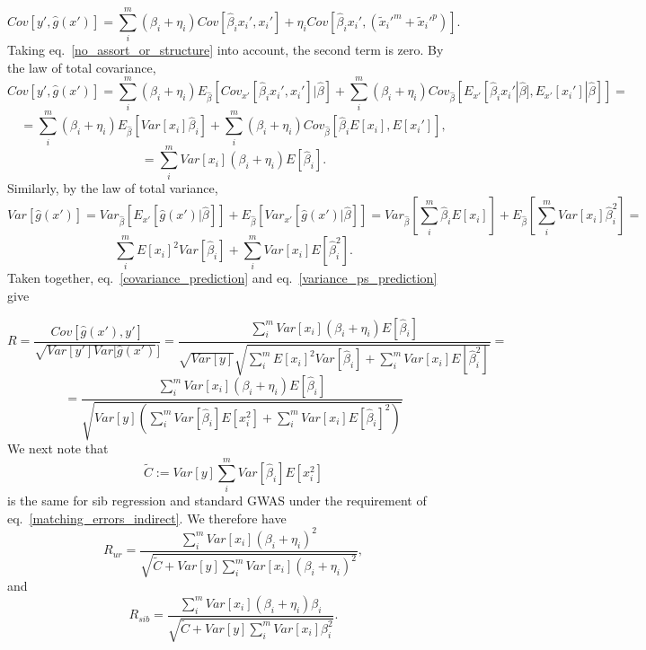 \documentclass[hidelinks, 12pt]{article}
\begin{document}
$$ Cov[y',\hat{g}(x')]=\sum_i^m(\beta_i+\eta_i)Cov[\hat{\beta}_ix_i',x_i']+\eta_iCov[\hat{\beta}_ix_i',(\tilde{x}_i'^m+\tilde{x}_i'^p)].$$
Taking eq.~\ref{no_assort_or_structure} into account, the second term is zero.  By the law of total covariance,
$$ Cov[y',\hat{g}(x')]=\sum_i^m(\beta_i+\eta_i)E_{\hat{\beta}}[Cov_{x'}[\hat{\beta}_ix_i',x_i']|\hat{\beta}]+\sum_i^m(\beta_i+\eta_i)Cov_{\hat{\beta}}[E_{x'}[\hat{\beta}_ix_i'|\hat{\beta}],E_{x'}[x_i']|\hat{\beta}]]=$$
$$=\sum_i^m(\beta_i+\eta_i)E_{\hat{\beta}}[Var[x_i]\hat{\beta}_i]+\sum_i^m(\beta_i+\eta_i)Cov_{\hat{\beta}}[\hat{\beta}_iE[x_i],E[x_i']],$$
\begin{equation}
\label{covariance_prediction}
=\sum_i^mVar[x_i](\beta_i+\eta_i)E[\hat{\beta}_i].
\end{equation}
Similarly, by the law of total variance,
$$Var[\hat{g}(x')] =Var_{\hat{\beta}}[E_{x'}[\hat{g}(x')|\hat{\beta}]]+E_{\hat{\beta}}[Var_{x'}[\hat{g}(x')|\hat{\beta}]] = Var_{\hat{\beta}}[\sum_i^m\hat{\beta}_iE[x_i]]+E_{\hat{\beta}}[\sum_i^mVar[x_i]\hat{\beta}_i^2]=$$
\begin{equation}
\label{variance_ps_prediction}
\sum_i^mE[x_i]^2Var[\hat{\beta}_i]+\sum_i^mVar[x_i]E[\hat{\beta}_i^2].
\end{equation}
Taken together, eq.~\ref{covariance_prediction} and eq.~\ref{variance_ps_prediction} give

$$R = \frac{Cov[\hat{g}(x'),y']}{\sqrt{Var[y']Var[\hat{g}(x')}]}=\frac{\sum_i^mVar[x_i](\beta_i+\eta_i)E[\hat{\beta}_i]}{\sqrt{Var[y]}\sqrt{\sum_i^mE[x_i]^2Var[\hat{\beta}_i]+\sum_i^mVar[x_i]E[\hat{\beta}_i^2]}} =$$
\begin{equation}
\label{R_indirect_general_form}
=\frac{\sum_i^mVar[x_i](\beta_i+\eta_i)E[\hat{\beta}_i]}{\sqrt{Var[y](\sum_i^mVar[\hat{\beta}_i]E[x_i^2]+\sum_i^mVar[x_i]E[\hat{\beta}_i]^2)}}
\end{equation}
We next note that 
$$\tilde{C}:=Var[y]\sum_i^mVar[\hat{\beta}_i]E[x_i^2]$$
is the same for sib regression and standard GWAS under the requirement of eq.~\ref{matching_errors_indirect}.  We therefore have %
\begin{equation}
\label{R_indirect_unrelated_longform}
R_{ur} = \frac{\sum_i^mVar[x_i](\beta_i+\eta_i)^2}{\sqrt{\tilde{C}+ Var[y]\sum_i^mVar[x_i](\beta_i+\eta_i)^2}},
\end{equation}
and
\begin{equation}
\label{R_indirect_sibs_longform}
R_{sib} = \frac{\sum_i^mVar[x_i](\beta_i+\eta_i)\beta_i}{\sqrt{\tilde{C}+ Var[y]\sum_i^mVar[x_i]\beta_i^2}}.
\end{equation}
\end{document}
